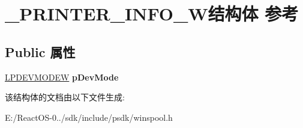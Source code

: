\hypertarget{struct___p_r_i_n_t_e_r___i_n_f_o__8_w}{}\section{\+\_\+\+P\+R\+I\+N\+T\+E\+R\+\_\+\+I\+N\+F\+O\+\_\+W结构体 参考}
\label{struct___p_r_i_n_t_e_r___i_n_f_o__8_w}
\subsection*{Public 属性}
\begin{DoxyCompactItemize}
\item 
\mbox{\label{struct___p_r_i_n_t_e_r___i_n_f_o__8_w_a2c279105f0f58ca36a79ef2d31101585}} 
\hyperlink{struct__devicemode_w}{L\+P\+D\+E\+V\+M\+O\+D\+EW} {\bfseries p\+Dev\+Mode}
\end{DoxyCompactItemize}


该结构体的文档由以下文件生成\+:\begin{DoxyCompactItemize}
\item 
E\+:/\+React\+O\+S-\/0../sdk/include/psdk/winspool.\+h\end{DoxyCompactItemize}
